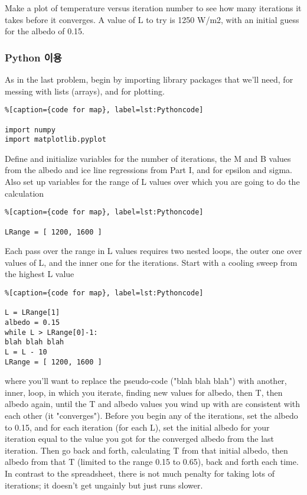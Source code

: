 Make a plot of temperature versus iteration number to see how many iterations it takes before it converges. A value of L to try is 1250 W/m2, with an initial guess for the albedo of 0.15.

\subsubsection{Python 이용}\index{}

As in the last problem, begin by importing library packages that we'll need, for messing with lists (arrays), and for plotting.

\begin{lstlisting}%[caption={code for map}, label=lst:Pythoncode]

import numpy
import matplotlib.pyplot
\end{lstlisting}

Define and initialize variables for the number of iterations, the M and B values from the albedo and ice line regressions from Part I, and for epsilon and sigma. Also set up variables for the range of L values over which you are going to do the calculation

\begin{lstlisting}%[caption={code for map}, label=lst:Pythoncode]

LRange = [ 1200, 1600 ]
\end{lstlisting}
Each pass over the range in L values requires two nested loops, the outer one over values of L, and the inner one for the iterations. Start with a cooling sweep from the highest L value

\begin{lstlisting}%[caption={code for map}, label=lst:Pythoncode]

L = LRange[1]
albedo = 0.15
while L > LRange[0]-1:
blah blah blah
L = L - 10
LRange = [ 1200, 1600 ]
\end{lstlisting}

where you'll want to replace the pseudo-code ("blah blah blah") with another, inner, loop, in which you iterate, finding new values for albedo, then T, then albedo again, until the T and albedo values you wind up with are consistent with each other (it "converges"). Before you begin any of the iterations, set the albedo to 0.15, and for each iteration (for each L), set the initial albedo for your iteration equal to the value you got for the converged albedo from the last iteration. Then go back and forth, calculating T from that initial albedo, then albedo from that T (limited to the range 0.15 to 0.65), back and forth each time. In contrast to the spreadsheet, there is not much penalty for taking lots of iterations; it doesn’t get ungainly but just runs slower.

